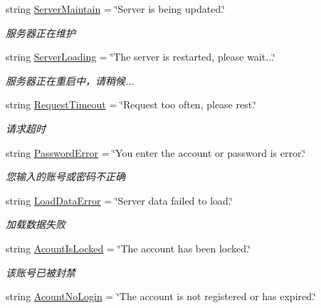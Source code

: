 \begin{DoxyCompactItemize}
string \mbox{\hyperlink{class_t_net_1_1_lang_1_1_language_af1a53ceca62027e4c711678a60e47e15}{Server\+Maintain}} = \char`\"{}Server is being updated.\char`\"{}
\begin{DoxyCompactList}\small\item\em 服务器正在维护 \end{DoxyCompactList}\item 
string \mbox{\hyperlink{class_t_net_1_1_lang_1_1_language_abedea2869c4abedcee3657759334e14a}{Server\+Loading}} = \char`\"{}The server is restarted, please wait...\char`\"{}
\begin{DoxyCompactList}\small\item\em 服务器正在重启中，请稍候... \end{DoxyCompactList}\item 
string \mbox{\hyperlink{class_t_net_1_1_lang_1_1_language_a5e773ddaeca098c847ef0ec5410094c4}{Request\+Timeout}} = \char`\"{}Request too often, please rest.\char`\"{}
\begin{DoxyCompactList}\small\item\em 请求超时 \end{DoxyCompactList}\item 
string \mbox{\hyperlink{class_t_net_1_1_lang_1_1_language_a81136fdf5a0d2cfc44c9178d699d0d1e}{Password\+Error}} = \char`\"{}You enter the account or password is error.\char`\"{}
\begin{DoxyCompactList}\small\item\em 您输入的账号或密码不正确 \end{DoxyCompactList}\item 
string \mbox{\hyperlink{class_t_net_1_1_lang_1_1_language_a9e949d64dce700c30c185139f3313ce2}{Load\+Data\+Error}} = \char`\"{}Server data failed to load.\char`\"{}
\begin{DoxyCompactList}\small\item\em 加载数据失败 \end{DoxyCompactList}\item 
string \mbox{\hyperlink{class_t_net_1_1_lang_1_1_language_a5e332303757d547cee972417c3629e00}{Acount\+Is\+Locked}} = \char`\"{}The account has been locked.\char`\"{}
\begin{DoxyCompactList}\small\item\em 该账号已被封禁 \end{DoxyCompactList}\item 
string \mbox{\hyperlink{class_t_net_1_1_lang_1_1_language_a58d185e4119ec522828844a02c00ba1e}{Acount\+No\+Login}} = \char`\"{}The account is not registered or has expired.\char`\"{}

\end{DoxyCompactItemize}

